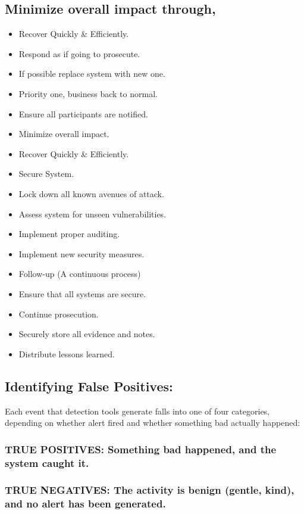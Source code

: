 \documentclass[british]{article}
\begin{document}
\subsection{Minimize overall impact through,}
\begin{itemize}
\item Recover Quickly \& Efficiently.
\item Respond as if going to prosecute.
\item If possible replace system with new one.
\item Priority one, business back to normal.
\item Ensure all participants are notified.
\item Minimize overall impact.
\item Recover Quickly \& Efficiently.
\item Secure System.
\item Lock down all known avenues of attack.
\item Assess system for unseen vulnerabilities.
\item Implement proper auditing.
\item Implement new security measures.
\item Follow-up (A continuous process)
\item Ensure that all systems are secure.
\item Continue prosecution.
\item Securely store all evidence and notes.
\item Distribute lessons learned.
\end{itemize}

\subsection{Identifying False Positives:}

Each event that detection tools generate falls into one of four categories,
depending on whether alert fired and whether something bad actually
happened:

\subsubsection{TRUE POSITIVES: Something bad happened, and the system caught it.}

\subsubsection{TRUE NEGATIVES: The activity is benign (gentle, kind), and no alert
has been generated.}
\end{document}
